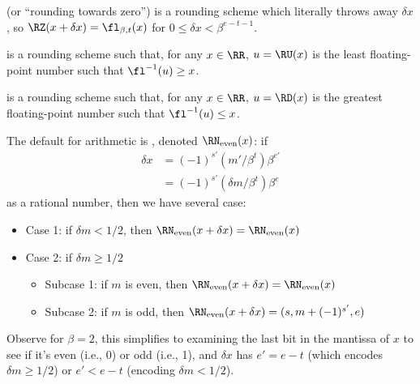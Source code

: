\begin{defn}
   (or ``rounding towards zero'') is a rounding
  scheme which literally throws away
  $\delta x$, so
  $\RZ(x+\delta x)=\fl_{\beta,t}(x)$ for $0\leq\delta x<\beta^{e-t-1}$.
\end{defn}

\begin{defn}
   is a rounding scheme such that, for any $x\in\RR$,
  $u=\RU(x)$ is the least floating-point number such that
  $\fl^{-1}(u)\geq x$.
\end{defn}

\begin{defn}
   is a rounding scheme such that, for any $x\in\RR$,
  $u=\RD(x)$ is the greatest floating-point number such that
  $\fl^{-1}(u)\leq x$.
\end{defn}


\begin{defn}
  The default for  arithmetic is
  ,
  denoted $\RN_{\text{even}}(x)$:
  if
  \begin{equation}
    \begin{split}
      \delta x &= (-1)^{s'}(m'/\beta^{t})\beta^{e'}\\
      &= (-1)^{s'}(\delta m/\beta^{t})\beta^{e}
    \end{split}
  \end{equation}
  as a rational number, then we have several case:
  \begin{itemize}
    \item Case 1: if $\delta m<1/2$, then $\RN_{\text{even}}(x+\delta x)=\RN_{\text{even}}(x)$
    \item Case 2: if $\delta m\geq1/2$
      \begin{itemize}
        \item Subcase 1: if $m$ is even, then $\RN_{\text{even}}(x+\delta x)=\RN_{\text{even}}(x)$
        \item Subcase 2: if $m$ is odd, then $\RN_{\text{even}}(x+\delta x)=(s,m+(-1)^{s'},e)$
      \end{itemize}
  \end{itemize}
  Observe for $\beta=2$, this simplifies to examining the last bit in
  the mantissa of $x$ to see if it's even (i.e., 0) or odd (i.e., 1),
  and $\delta x$ has $e'=e-t$ (which encodes $\delta m\geq1/2$) or
  $e'<e-t$ (encoding $\delta m<1/2$).
\end{defn}

